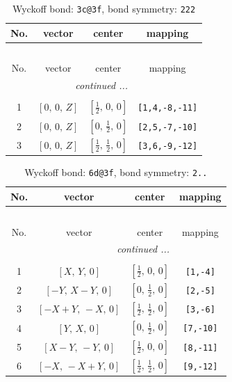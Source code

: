 \documentclass[fleqn,8pt]{jsarticle}
\begin{document}
\renewcommand{\arraystretch}{1.2}
\begin{longtable}{cccc}
\caption{Wyckoff bond: {\tt 3c@3f}, bond symmetry: {\tt 222}}
 \\
 \hline \hline
No. & vector & center & mapping \\ \hline \endfirsthead

\multicolumn{3}{l}{\tablename\ \thetable{}} \\
 \hline \hline
No. & vector & center & mapping \\ \hline \endhead

 \hline \hline
\multicolumn{3}{r}{\footnotesize\it continued ...} \\ \endfoot

 \hline \hline
\multicolumn{3}{r}{} \\ \endlastfoot

1 & $\left[ 0,\, 0,\, Z \right]$ & $\left[ \frac{1}{2},\, 0,\, 0 \right]$ & {\tt [1,4,-8,-11]} \\ \hline
2 & $\left[ 0,\, 0,\, Z \right]$ & $\left[ 0,\, \frac{1}{2},\, 0 \right]$ & {\tt [2,5,-7,-10]} \\ \hline
3 & $\left[ 0,\, 0,\, Z \right]$ & $\left[ \frac{1}{2},\, \frac{1}{2},\, 0 \right]$ & {\tt [3,6,-9,-12]} \\
\end{longtable}
\renewcommand{\arraystretch}{1.2}
\begin{longtable}{cccc}
\caption{Wyckoff bond: {\tt 6d@3f}, bond symmetry: {\tt 2..}}
 \\
 \hline \hline
No. & vector & center & mapping \\ \hline \endfirsthead

\multicolumn{3}{l}{\tablename\ \thetable{}} \\
 \hline \hline
No. & vector & center & mapping \\ \hline \endhead

 \hline \hline
\multicolumn{3}{r}{\footnotesize\it continued ...} \\ \endfoot

 \hline \hline
\multicolumn{3}{r}{} \\ \endlastfoot

1 & $\left[ X,\, Y,\, 0 \right]$ & $\left[ \frac{1}{2},\, 0,\, 0 \right]$ & {\tt [1,-4]} \\ \hline
2 & $\left[ - Y,\, X - Y,\, 0 \right]$ & $\left[ 0,\, \frac{1}{2},\, 0 \right]$ & {\tt [2,-5]} \\ \hline
3 & $\left[ - X + Y,\, - X,\, 0 \right]$ & $\left[ \frac{1}{2},\, \frac{1}{2},\, 0 \right]$ & {\tt [3,-6]} \\ \hline
4 & $\left[ Y,\, X,\, 0 \right]$ & $\left[ 0,\, \frac{1}{2},\, 0 \right]$ & {\tt [7,-10]} \\ \hline
5 & $\left[ X - Y,\, - Y,\, 0 \right]$ & $\left[ \frac{1}{2},\, 0,\, 0 \right]$ & {\tt [8,-11]} \\ \hline
6 & $\left[ - X,\, - X + Y,\, 0 \right]$ & $\left[ \frac{1}{2},\, \frac{1}{2},\, 0 \right]$ & {\tt [9,-12]} \\
\end{longtable}
\end{document}
